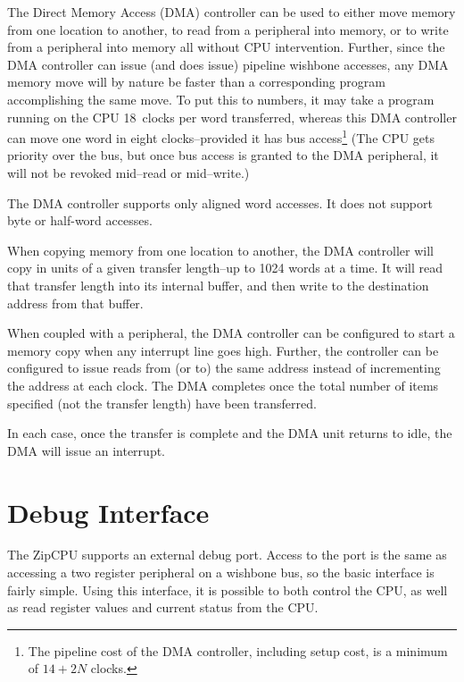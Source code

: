 \documentclass{gqtekspec}
\begin{document}
The Direct Memory Access (DMA) controller can be used to either move memory
from one location to another, to read from a peripheral into memory, or to
write from a peripheral into memory all without CPU intervention.  Further,
since the DMA controller can issue (and does issue) pipeline wishbone accesses,
any DMA memory move will by nature be faster than a corresponding program
accomplishing the same move.  To put this to numbers, it may take a program
running on the CPU 18~clocks per word transferred, whereas this DMA controller
can move one word in eight clocks--provided it has bus
access\footnote{The pipeline cost of the DMA controller, including setup cost,
is a minimum of $14+2N$ clocks.} (The CPU gets priority over the bus, but once
bus access is granted to the DMA peripheral, it will not be revoked mid--read
or mid--write.)

The DMA controller supports only aligned word accesses.  It does not support
byte or half-word accesses.

When copying memory from one location to another, the DMA controller will
copy in units of a given transfer length--up to 1024 words at a time.  It will
read that transfer length into its internal buffer, and then write to the
destination address from that buffer.

When coupled with a peripheral, the DMA controller can be configured to start
a memory copy when any interrupt line goes high.  Further, the controller can
be configured to issue reads from (or to) the same address instead of
incrementing the address at each clock.  The DMA completes once the total
number of items specified (not the transfer length) have been transferred.

In each case, once the transfer is complete and the DMA unit returns to
idle, the DMA will issue an interrupt.


\section{Debug Interface}\label{sec:debug}

The ZipCPU supports an external debug port.  Access to the port is the
same as accessing a two register peripheral on a wishbone bus, so the basic
interface is fairly simple.  Using this interface, it is possible to both
control the CPU, as well as read register values and current status from the
CPU.
\end{document}
